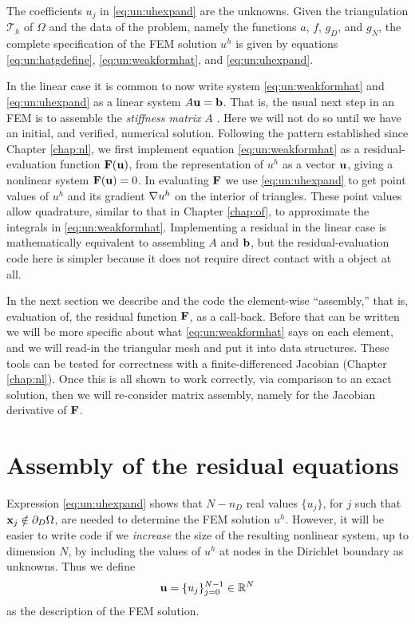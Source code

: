 The coefficients $u_j$ in \eqref{eq:un:uhexpand} are the unknowns.  Given the triangulation $\mathcal{T}_h$ of $\Omega$ and the data of the problem, namely the functions $a$, $f$, $g_D$, and $g_N$, the complete specification of the FEM solution $u^h$ is given by equations \eqref{eq:un:hatgdefine}, \eqref{eq:un:weakformhat}, and \eqref{eq:un:uhexpand}.

In the linear case it is common to now write system \eqref{eq:un:weakformhat} and \eqref{eq:un:uhexpand} as a linear system $A \mathbf{u} = \mathbf{b}$.  That is, the usual next step in an FEM is to assemble the \emph{stiffness matrix} $A$ \citep{Elmanetal2005}.  Here we will not do so until we have an initial, and verified, numerical solution.  Following the pattern established since Chapter \ref{chap:nl}, we first implement equation \eqref{eq:un:weakformhat} as a residual-evaluation function $\mathbf{F}(\mathbf{u})$, from the representation of $u^h$ as a vector $\mathbf{u}$, giving a nonlinear system $\mathbf{F}(\mathbf{u}) = 0$.  In evaluating $\mathbf{F}$ we use \eqref{eq:un:uhexpand} to get point values of $u^h$ and its gradient $\nabla u^h$ on the interior of triangles.  These point values allow quadrature, similar to that in Chapter \ref{chap:of}, to approximate the integrals in \eqref{eq:un:weakformhat}.  Implementing a residual in the linear case is mathematically equivalent to assembling $A$ and $\mathbf{b}$, but the residual-evaluation code here is simpler because it does not require direct contact with a \pMat object at all.

In the next section we describe and the code the element-wise ``assembly,'' that is, evaluation of, the residual function $\mathbf{F}$, as a \pSNES call-back.  Before that can be written we will be more specific about what \eqref{eq:un:weakformhat} says on each element, and we will read-in the triangular mesh and put it into \PETSc data structures.  These tools can be tested for correctness with a finite-differenced Jacobian (Chapter \ref{chap:nl}).  Once this is all shown to work correctly, via comparison to an exact solution, then we will re-consider matrix assembly, namely for the Jacobian derivative of $\mathbf{F}$.


\section{Assembly of the residual equations}

Expression \eqref{eq:un:uhexpand} shows that $N-n_D$ real values $\{u_j\}$, for $j$ such that $\mathbf{x}_j \notin \partial_D \Omega$, are needed to determine the FEM solution $u^h$.  However, it will be easier to write code if we \emph{increase} the size of the resulting nonlinear system, up to dimension $N$, by including the values of $u^h$ at nodes in the Dirichlet boundary as unknowns.  Thus we define
\begin{equation}
\mathbf{u} = \{u_j\}_{j=0}^{N-1} \in \mathbb{R}^N  \label{eq:un:unknowns}
\end{equation}
as the description of the FEM solution.

